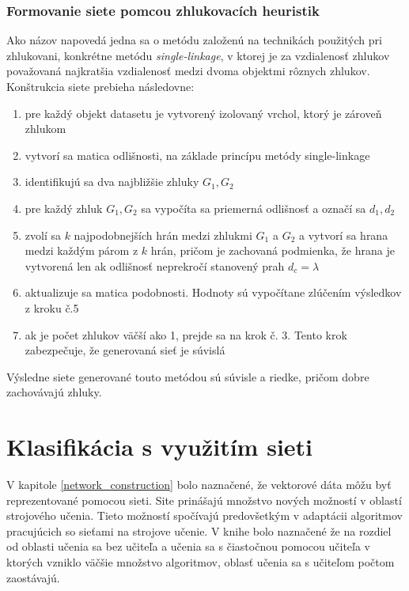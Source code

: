 \documentclass[slovak,master,dept460,male,cpp,cpdeclaration]{diploma}
\begin{document}
\subsubsection{Formovanie siete pomcou zhlukovacích heuristik}
Ako názov napovedá jedna sa o metódu založenú na technikách použitých pri zhlukovani, konkrétne metódu \textit{single-linkage}, v ktorej je za vzdialenosť zhlukov považovaná najkratšia vzdialenosť medzi dvoma objektmi rôznych zhlukov. 
Konštrukcia siete prebieha následovne:
\begin{enumerate}
\item pre každý objekt datasetu je vytvorený izolovaný vrchol, ktorý je zároveň zhlukom
\item vytvorí sa matica odlišnosti, na základe princípu metódy single-linkage
\item identifikujú sa dva najbližšie zhluky $G_1, G_2$
\item pre každý zhluk $G_1, G_2$ sa vypočíta sa priemerná odlišnosť a označí sa $d_1, d_2$
\item zvolí sa $k$ najpodobnejších hrán medzi zhlukmi $G_1$ a $G_2$ a vytvorí sa hrana medzi každým párom z $k$ hrán, pričom je zachovaná podmienka, že hrana je vytvorená len ak odlišnosť neprekročí stanovený prah $d_c = \lambda$
\item  aktualizuje sa matica podobnosti. Hodnoty sú vypočítane zlúčením výsledkov z kroku č.5
\item ak je počet zhlukov väčší ako 1, prejde sa na krok č. 3. Tento krok zabezpečuje, že generovaná sieť je súvislá
\end{enumerate}
Výsledne siete generované touto metódou sú súvisle a riedke, pričom dobre zachovávajú zhluky. \cite{clustering_construction}

\section{Klasifikácia s využitím sieti}
V kapitole \ref{network_construction} bolo naznačené, že vektorové dáta môžu byť reprezentované pomocou sieti. Site prinášajú množstvo nových možností v oblastí strojového učenia. Tieto možností spočívajú predovšetkým v adaptácii algoritmov pracujúcich so sieťami na strojove učenie. V knihe \cite{godbook} bolo naznačené že na rozdiel od oblasti učenia sa bez učiteľa a učenia sa s čiastočnou pomocou učiteľa v ktorých vzniklo väčšie množstvo algoritmov, oblasť učenia sa s učiteľom počtom zaostávajú.
\end{document}
